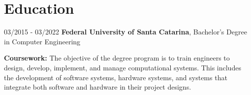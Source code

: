 \section{Education}
	\begin{twocolentry}{03/2015 - 03/2022}
		\textbf{Federal University of Santa Catarina}, Bachelor's Degree in Computer Engineering
	\end{twocolentry}

	\vspace{0.10 cm}
	\begin{onecolentry}
		\begin{highlights}
			\item \textbf{Coursework:} The objective of the degree program is to train engineers to design, develop, implement, and manage computational systems. This includes the development of software systems, hardware systems, and systems that integrate both software and hardware in their project designs.
		\end{highlights}
	\end{onecolentry}